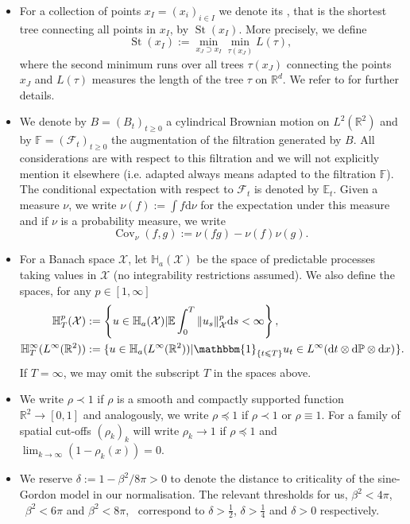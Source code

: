 \documentclass[11pt, a4paper]{scrartcl}
\numberwithin{equation}{section}
\theoremstyle{plain}
\theoremstyle{remark}
\newcommand{\assign}{:=}
\newcommand{\mathd}{\mathrm{d}}
\newcommand{\nosymbol}{}
\newcommand{\tmop}[1]{\ensuremath{\operatorname{#1}}}
\newcommand{\tmtextit}[1]{\text{{\itshape{#1}}}}
\begin{document}
\begin{itemize}
  \item For a collection of points $x_I = (x_i)_{i \in I}$ we denote its
  \tmtextit{Steiner diameter}, that is the shortest tree connecting all points
  in $x_I$, by $\tmop{St} (x_I)$. More precisely, we define
  \begin{equation}
    \tmop{St} (x_I) \assign \min_{x_J \supset x_I} \min_{\tau (x_J)} L (\tau),
    \label{eq:def-St}
  \end{equation}
  where the second minimum runs over all trees $\tau (x_J)$ connecting the
  points $x_J$ and $L (\tau)$ measures the length of the tree $\tau$ on
  $\mathbb{R}^d$. We refer to {\cite{giulianiGentleIntroductionRigorous2021}}
  for further details.
  
  \item We denote by $B = (B_t)_{t \geqslant 0}$ a cylindrical Brownian motion
  on $L^2 (\mathbb{R}^2)$ and by $\mathbb{F}= (\mathcal{F}_t)_{t \geqslant 0}$
  the augmentation of the filtration generated by $B$. All considerations are
  with respect to this filtration and we will not explicitly mention it
  elsewhere (i.e. adapted always means adapted to the filtration
  $\mathbb{F}$). The conditional expectation with respect to $\mathcal{F}_t$
  is denoted by $\mathbb{E}_t$. Given a measure $\nu$, we
  write $\nu (f) \assign \int f \mathd \nu$ for the expectation under this
  measure and if $\nu$ is a probability measure, we write
  \[ \tmop{Cov}_{\nu} (f, g) \assign \nu (fg) - \nu (f) \nu (g) . \]
  \item For a Banach space $\mathcal{X}$, let $\mathbb{H}_a (\mathcal{X})$ be
  the space of predictable processes taking values in $\mathcal{X}$ (no
  integrability restrictions assumed). We also define the spaces, for any $p
  \in [1, \infty]$
  \begin{align*}
       \mathbb{H}^p_T (\mathcal{X}) &\assign \left\{ u \in \mathbb{H}_a
       (\mathcal{X}) | \mathbb{E} \int_0^T \| u_s \|_{\mathcal{X}}^p \mathd s
       < \infty \right\},\\
       \mathbb{H}^{\infty}_T (L^{\infty} (\mathbb{R}^2)) &\assign \{ u \in
       \mathbb{H}_a (L^{\infty} (\mathbb{R}^2)) | \mathbbm{1}_{\{ t \leqslant
       T \}} u_t \in L^{\infty} (\mathd t \otimes \mathd \mathbb{P} \otimes \mathd
       x)_{\nosymbol} \}.
    \end{align*}
  If $T = \infty$, we may omit the subscript $T$ in the spaces above. 
  
  \item We write $\rho \prec 1$ if $\rho$ is a smooth and compactly supported
  function $\mathbb{R}^2 \rightarrow [0, 1]$ and analogously, we write $\rho
  \preceq 1$ if $\rho \prec 1$ or $\rho \equiv 1$. For a family of spatial
  cut-offs $(\rho_k)_k$ will write $\rho_k \rightarrow 1$ if $\rho\preceq 1$ and
  $\lim_{k\to\infty}(1-\rho_k(x))=0$.
  
  \item We reserve $\delta \assign 1 - \beta^2 / 8 \pi > 0$ to denote the
  distance to criticality of the sine-Gordon model in our normalisation. The
  relevant thresholds for us, $\beta^2 < 4 \pi$, \ $\beta^2 < 6 \pi$ and
  $\beta^2 < 8 \pi$, \ correspond to $\delta > \frac{1}{2}$, $\delta >
  \frac{1}{4}$ and $\delta > 0$ respectively.
\end{itemize}
\end{document}
